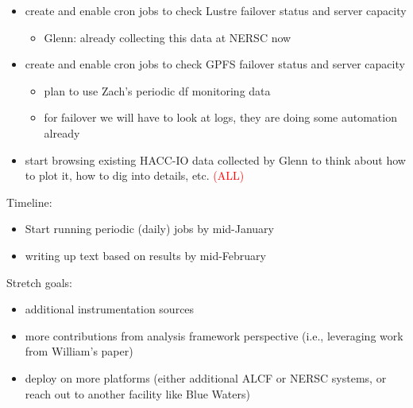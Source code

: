 \documentclass[conference,10pt,compsocconf]{IEEEtran}
\newcommand{\assign}[1]{\textcolor{red}{(#1)}}
\begin{document}
\begin{itemize}
\item create and enable cron jobs to check Lustre failover status and server
capacity
\begin{itemize}
\item Glenn: already collecting this data at NERSC now
\end{itemize}

\item create and enable cron jobs to check GPFS failover status and server
capacity
\begin{itemize}
\item plan to use Zach's periodic df monitoring data
\item for failover we will have to look at logs, they are doing some
automation already
\end{itemize}

\item start browsing existing HACC-IO data collected by Glenn to think about
how to plot it, how to dig into details, etc. \assign{ALL}
\end{itemize}

Timeline:
\begin{itemize}
\item Start running periodic (daily) jobs by mid-January
\item writing up text based on results by mid-February
\end{itemize}

Stretch goals:
\begin{itemize}
\item additional instrumentation sources
\item more contributions from analysis framework perspective (i.e.,
leveraging work from William's paper) 
\item deploy on more platforms (either additional ALCF or NERSC systems, or
reach out to another facility like Blue Waters)
\end{itemize}



\end{document}
